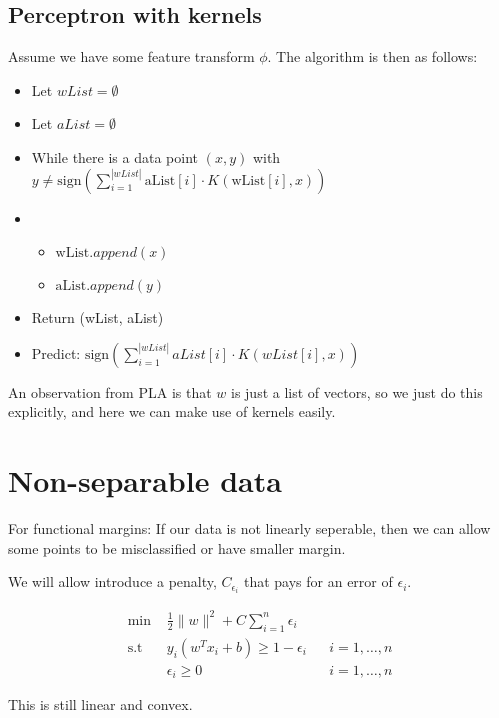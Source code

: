 \documentclass{article}
\begin{document}
    \subsection{Perceptron with kernels}
        Assume we have some feature transform $\phi$. The algorithm is then as follows:
        \begin{itemize}
            \item Let $wList = \emptyset$
            \item Let $aList = \emptyset$
            \item While there is a data point $(x, y)$ with $y \neq \text{sign}(
            \sum_{i=1}^{|wList|}\text{aList}[i] \cdot K(\text{wList}[i], x)
            )$
            \item \begin{itemize}
                \item $\text{wList}.append(x)$
                \item $\text{aList}.append(y)$
            \end{itemize}
            \item Return (wList, aList)
            \item Predict: $\text{sign}(
            \sum_{i=1}^{|wList|}{
            aList[i] \cdot K(wList[i], x)
            }
            )$
        \end{itemize}
        An observation from PLA is that $w$ is just a list of vectors, so we just do this explicitly, and here we can make use of kernels easily.
        

\section{Non-separable data}
    For functional margins: If our data is not linearly seperable, then we can allow some points to be misclassified or have smaller margin.
    
    We will allow introduce a penalty, $C_{\epsilon_i}$ that pays for an error of $\epsilon_i$.
    
  \begin{align}
    \text{min } & \frac{1}{2}\lVert w \rVert^2 + C\sum_{i=1}^{n}\epsilon_i\\
    \text{s.t } & y_i(w^Tx_i+b)\geq 1 - \epsilon_i &&  i=1,\dots,n\\
    & \epsilon_i \geq 0 && i = 1, \dots, n
  \end{align}
  
  This is still linear and convex.
  
\end{document}
